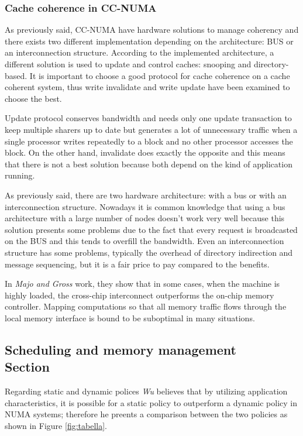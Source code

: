 \documentclass[a4paper,10pt]{article}
\begin{document}
\begin{multicols}{2}
\subsubsection{Cache coherence in CC-NUMA}
As previously said, CC-NUMA have hardware solutions to manage coherency and there exists two different implementation depending on the architecture: BUS or an interconnection structure. According to the implemented architecture, a different solution is used to update and control caches: snooping and directory-based. It is important to choose a good protocol for cache coherence on a cache coherent system, thus write invalidate and write update have been examined to choose the best.\par
\parindent 10mm Update protocol conserves bandwidth and needs only one update  transaction to keep multiple sharers up to date but generates a lot of unnecessary traffic when a single processor writes  repeatedly to a block and no other processor accesses the block. On the other hand, invalidate does exactly the opposite and this means that there is not a best solution because both depend on the kind of application running.\par
\parindent 10mm As previously said, there are two hardware architecture: with a bus or with an interconnection structure. Nowadays it is common knowledge that using a bus architecture with a large number of nodes doesn't work very well because this solution presents some problems due to the fact that every request is broadcasted on the BUS and this tends to overfill the bandwidth. Even an interconnection structure has some problems, typically the overhead of directory indirection and message sequencing, but it is a fair price to pay compared to the benefits.\cite{moh}\par
\parindent 10mm In \emph{Majo and Gross} work, they show that in some cases, when the machine is highly loaded, the cross-chip interconnect outperforms the on-chip memory controller. Mapping computations so that all memory traffic flows through the local memory interface is bound to be suboptimal in many situations. \cite{Majo_memorysystem}

\subsection{Scheduling and memory management \\ Section}

Regarding static and dynamic polices \emph{Wu} believes that by utilizing application characteristics, it is possible for a static policy to outperform a dynamic policy in NUMA systems; therefore he preents a comparison between the two policies as shown in Figure \ref{fig:tabella}.



\end{multicols}
\end{document}
